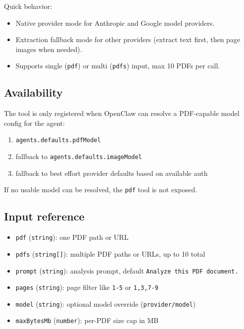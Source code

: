 Quick behavior:

\begin{itemize}
  \item Native provider mode for Anthropic and Google model providers.
  \item Extraction fallback mode for other providers (extract text first, then page images when needed).
  \item Supports single (\texttt{pdf}) or multi (\texttt{pdfs}) input, max 10 PDFs per call.
\end{itemize}


\subsection{Availability}


The tool is only registered when OpenClaw can resolve a PDF-capable model config for the agent:

\begin{enumerate}
  \item \texttt{agents.defaults.pdfModel}
  \item fallback to \texttt{agents.defaults.imageModel}
  \item fallback to best effort provider defaults based on available auth
\end{enumerate}


If no usable model can be resolved, the \texttt{pdf} tool is not exposed.

\subsection{Input reference}


\begin{itemize}
  \item \texttt{pdf} (\texttt{string}): one PDF path or URL
  \item \texttt{pdfs} (\texttt{string[]}): multiple PDF paths or URLs, up to 10 total
  \item \texttt{prompt} (\texttt{string}): analysis prompt, default \texttt{Analyze this PDF document.}
  \item \texttt{pages} (\texttt{string}): page filter like \texttt{1-5} or \texttt{1,3,7-9}
  \item \texttt{model} (\texttt{string}): optional model override (\texttt{provider/model})
  \item \texttt{maxBytesMb} (\texttt{number}): per-PDF size cap in MB
\end{itemize}


